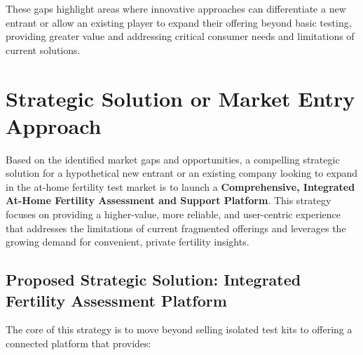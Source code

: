 \documentclass{article}
\begin{document}
These gaps highlight areas where innovative approaches can differentiate a new entrant or allow an existing player to expand their offering beyond basic testing, providing greater value and addressing critical consumer needs and limitations of current solutions.

\section{Strategic Solution or Market Entry Approach}

Based on the identified market gaps and opportunities, a compelling strategic solution for a hypothetical new entrant or an existing company looking to expand in the at-home fertility test market is to launch a \textbf{Comprehensive, Integrated At-Home Fertility Assessment and Support Platform}. This strategy focuses on providing a higher-value, more reliable, and user-centric experience that addresses the limitations of current fragmented offerings and leverages the growing demand for convenient, private fertility insights.

\subsection{Proposed Strategic Solution: Integrated Fertility Assessment Platform}

The core of this strategy is to move beyond selling isolated test kits to offering a connected platform that provides:
\end{document}
